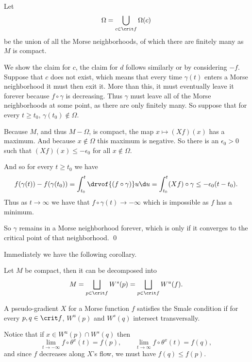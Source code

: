 \eprop

\bproof

    Let
    $$ \Omega = \bigcup_{c\in\crit f}\Omega(c) $$
    be the union of all the Morse neighborhoods, of which there are finitely many as $M$ is compact.

    We show the claim for $c$, the claim for $d$ follows similarly or by considering $-f$.
    Suppose that $c$ does not exist, which means that every time $\gamma(t)$ enters a Morse neighborhood
    it must then exit it.
    More than this, it must eventually leave it forever because $f\circ\gamma$ is decreasing.
    Thus $\gamma$ must leave all of the Morse neighborhoods at some point, as there are only finitely many.
    So suppose that for every $t\geq t_0$, $\gamma(t_0)\notin\Omega$.

    Because $M$, and thus $M-\Omega$, is compact, the map $x\mapsto(Xf)(x)$ has a maximum.
    And because $x\notin\Omega$ this maximum is negative.
    So there is an $\epsilon_0>0$ such that $(Xf)(x)\leq-\epsilon_0$ for all $x\notin\Omega$.

    And so for every $t\geq t_0$ we have
    $$ f(\gamma(t)) - f(\gamma(t_0)) = \int_{t_0}^t\drvof{(f\circ\gamma)}u\d u
    = \int_{t_0}^t(Xf)\circ\gamma \leq -\epsilon_0(t-t_0) . $$
    Thus as $t\to\infty$ we have that $f\circ\gamma(t)\to-\infty$ which is impossible as $f$ has a minimum.

    So $\gamma$ remains in a Morse neighborhood forever, which is only if it converges to the critical point
    of that neighborhood.
    \qed

\eproof

Immediately we have the following corollary.

\bcoro

    Let $M$ be compact, then it can be decomposed into
    $$ M = \bigsqcup_{p\in\crit f}W^s(p) = \bigsqcup_{p\in\crit f}W^u(f) . $$

\ecoro

\bdefn

    A pseudo-gradient $X$ for a Morse function $f$ satisfies the {\emphcolor Smale condition} if for every
    $p,q\in\crit f$, $W^u(p)$ and $W^s(q)$ intersect transversally.

\edefn

Notice that if $x\in W^u(p)\cap W^s(q)$ then
$$ \lim_{t\to-\infty} f\circ\theta^x(t) = f(p),\qquad \lim_{t\to\infty}f\circ\theta^x(t) = f(q) , $$
and since $f$ decreases along $X$'s flow, we must have $f(q)\leq f(p)$.

